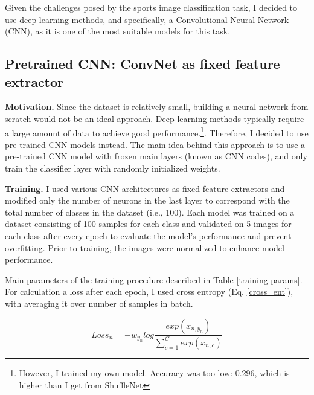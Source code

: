 \documentclass[reqno]{article}
\begin{document}
	Given the challenges posed by the sports image classification task, I decided to use deep learning methods, and specifically, a Convolutional Neural Network (CNN), as it is one of the most suitable models for this task.
	
	\subsection{Pretrained CNN: ConvNet as fixed feature extractor}
	
	\textbf{Motivation.} Since the dataset is relatively small, building a neural network from scratch would not be an ideal approach. Deep learning methods typically require a large amount of data to achieve good performance.\footnote{However, I trained my own model. Accuracy was too low: 0.296, which is higher than I get from ShuffleNet}. Therefore, I decided to use pre-trained CNN models instead. The main idea behind this approach is to use a pre-trained CNN model with frozen main layers (known as CNN codes), and only train the classifier layer with randomly initialized weights.
	
	\textbf{Training.} I used various CNN architectures as fixed feature extractors and modified only the number of neurons in the last layer to correspond with the total number of classes in the dataset (i.e., 100). Each model was trained on a dataset consisting of 100 samples for each class and validated on 5 images for each class after every epoch to evaluate the model's performance and prevent overfitting. Prior to training, the images were normalized to enhance model performance.
	
	Main parameters of the training procedure described in Table \ref{training-params}. For calculation a loss after each epoch, I used cross entropy (Eq. \ref{cross_ent}), with averaging it over number of samples in batch.
	
	\begin{equation}
		\label{cross_ent}
		Loss_n = -w_{y_n}log\frac{exp(x_{n,y_n})}{\sum_{c=1}^C exp(x_{n,c})}
	\end{equation}
\end{document}
